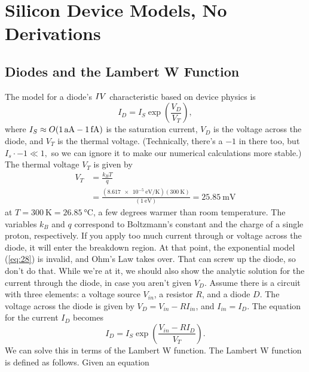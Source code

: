 \section{Silicon Device Models, No Derivations}
\subsection{Diodes and the Lambert W Function}
The model for a diode's $I \- V$ characteristic  based on device physics is
\begin{equation}
\label{eq:28}
I_{D} = I_{S} \exp \left( \frac{V_{D}}{V_{T}} \right),
\end{equation}
where $I_{S} \approx O(\SI{1}{aA} \-- \SI{1}{fA})$ is the saturation current, $V_{D}$ is the voltage across the diode, and $V_{T}$ is the thermal voltage. (Technically, there's a $-1$ in there too, but $I_{s} \cdot  -1 \ll 1,$ so we can ignore it to make our numerical calculations more stable.) The thermal voltage $V_{T}$ is given by
\begin{equation}
  \begin{aligned}
\label{eq:29}
V_{T} &= \frac{k_{B} T}{q} \\ &= \frac{\left( \SI{8.617e-5}{\electronvolt \per \kelvin} \right) \left( \SI{300}{\kelvin} \right) }{ \left( \SI{1}{\electronvolt} \right) } = \SI{25.85}{\milli \volt}
\end{aligned}
\end{equation}
at $T = \SI{300}{\kelvin} = \SI{26.85}{\celsius}$, a few degrees warmer than room temperature. The variables $k_{B}$ and $q$ correspond to Boltzmann's constant and the charge of a single proton, respectively. If you apply too much current through or voltage across the diode, it will enter the breakdown region. At that point, the exponential model (\ref{eq:28}) is invalid, and Ohm's Law takes over. That can screw up the diode, so don't do that.
While we're at it, we should also show the analytic solution for the current through the diode, in case you aren't given $V_{D}$. Assume there is a circuit with three elements: a voltage source $V_{in}$, a resistor $R$, and a diode $D$. The voltage across the diode is given by $V_{D} = V_{in} - R I_{in}$, and $I_{in} = I_{D}$. The equation for the current $I_{D}$ becomes
\begin{equation}
\label{eq:30}
I_{D} = I_{S} \exp \left( \frac{V_{in} - R I_{D}}{V_{T}} \right).
\end{equation}
We can solve this in terms of the Lambert W function. The Lambert W function is defined as follows. Given an equation
